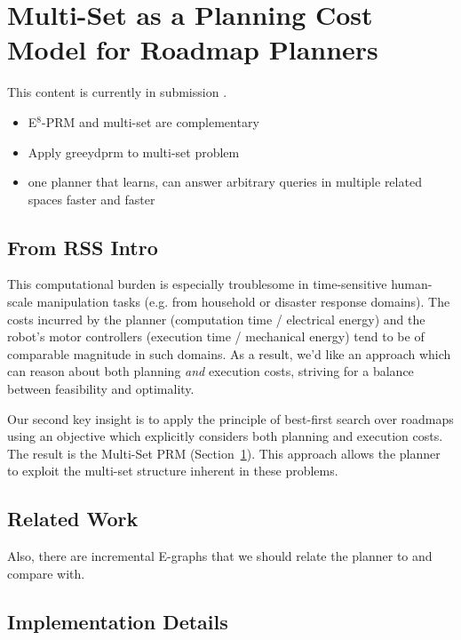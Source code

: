 \chapter{Multi-Set as a Planning Cost Model for Roadmap Planners}
\label{chap:multi-set-prm}

This content is currently in submission \cite{dellin2015multiset}.

\begin{itemize}
\item E$^8$-PRM and multi-set are complementary
\item Apply greeydprm to multi-set problem
\item one planner that learns, can answer arbitrary queries
   in multiple related spaces faster and faster
\end{itemize}

\section{From RSS Intro}

This computational burden is especially troublesome
in time-sensitive human-scale manipulation tasks
(e.g. from household or disaster response domains).
The costs incurred by the planner
(computation time / electrical energy)
and the robot's motor controllers
(execution time / mechanical energy)
tend to be of comparable magnitude in such domains.
As a result,
we'd like an approach which can reason about both
planning \emph{and} execution costs,
striving for a balance between feasibility and optimality.

Our second key insight
is to apply the principle of best-first search over roadmaps
using an objective which explicitly considers both planning and
execution costs.
The result is the Multi-Set PRM (Section~\ref{chap:multi-set-prm}).
This approach allows the planner to exploit the multi-set structure
inherent in these problems.

\section{Related Work}

Also, there are incremental E-graphs \cite{phillips2013anytimeegraphs}
that we should relate the planner to and compare with.

\section{Implementation Details}

